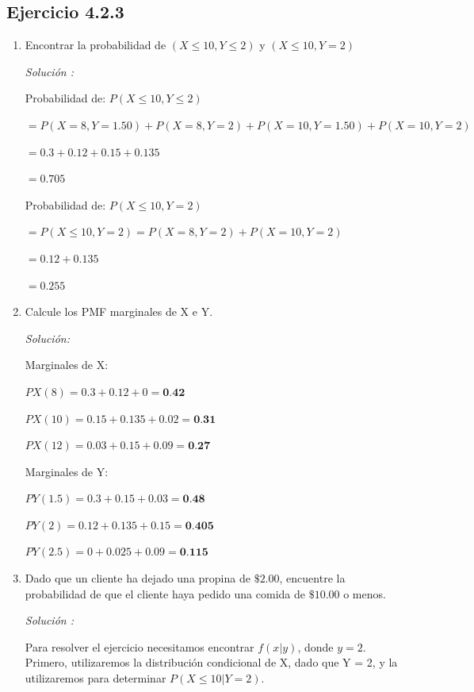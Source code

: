 \documentclass{article}\usepackage[]{graphicx}\usepackage[]{color}
\begin{document}
\subsection{Ejercicio 4.2.3}
\begin{enumerate}
    \item Encontrar la probabilidad de $(X \leq 10, Y\leq 2)$ y $(X\leq 10, Y=2)$
    
\textit{Solución :}


\begin{center}

Probabilidad de: $ P(X \leq 10, Y \leq  2)$

$= P(X = 8, Y = 1.50) + P(X = 8, Y = 2) + P(X = 10, Y=1.50) +P(X=10, Y=2)$

$= 0.3 + 0.12 + 0.15 + 0.135$

$= 0.705 $ 


Probabilidad de:   $P(X\leq 10, Y = 2)$

$= P(X\leq 10, Y = 2)= P(X = 8, Y = 2)+P(X = 10,Y = 2)$

$= 0.12 + 0.135 $

$= 0.255$
\end{center}

\item Calcule los PMF marginales de X e Y.

\textit{Solución:}

Marginales de X:

\begin{center}
$PX(8) = 0.3 + 0.12 + 0 = \textbf{0.42}$

$PX(10) = 0.15 + 0.135 + 0.02 = \textbf{0.31} $

$PX(12) = 0.03 + 0.15 + 0.09 = \textbf{0.27}$
\end{center}

Marginales de Y:


\begin{center}
$PY(1.5)= 0.3 + 0.15 + 0.03 = \textbf{0.48}$

$PY(2) = 0.12 + 0.135 + 0.15 = \textbf{0.405}$

$PY(2.5) =0  + 0.025 + 0.09 = \textbf{0.115}$
\end{center}

\item Dado que un cliente ha dejado una propina de  $\$2.00 $, encuentre la probabilidad de que el cliente haya pedido una comida de  $ \$10.00$ o menos.

\textit{Solución :}

Para resolver el ejercicio necesitamos encontrar $f(x|y)$, donde $y = 2$. Primero, utilizaremos la  distribución condicional de X, dado que
Y = 2, y la utilizaremos para determinar $P(X \leq 10|Y = 2)$.


\end{enumerate}
\end{document}
